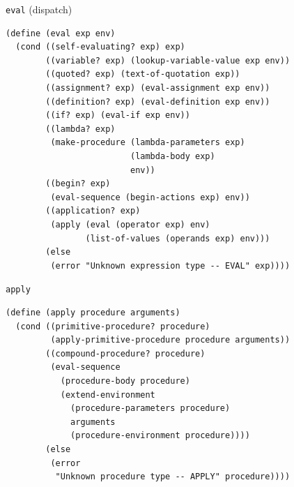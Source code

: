 \documentclass[presentation, bigger]{beamer}
\begin{document}
\begin{frame}[label={sec:org54f6ddb},fragile]{\texttt{eval} (dispatch)}
\begin{lstlisting}
(define (eval exp env)
  (cond ((self-evaluating? exp) exp)
        ((variable? exp) (lookup-variable-value exp env))
        ((quoted? exp) (text-of-quotation exp))
        ((assignment? exp) (eval-assignment exp env))
        ((definition? exp) (eval-definition exp env))
        ((if? exp) (eval-if exp env))
        ((lambda? exp)
         (make-procedure (lambda-parameters exp)
                         (lambda-body exp)
                         env))
        ((begin? exp)
         (eval-sequence (begin-actions exp) env))
        ((application? exp)
         (apply (eval (operator exp) env)
                (list-of-values (operands exp) env)))
        (else
         (error "Unknown expression type -- EVAL" exp))))
\end{lstlisting}
\end{frame}
\begin{frame}[label={sec:org1c939df},fragile]{\texttt{apply}}
\begin{lstlisting}
(define (apply procedure arguments)
  (cond ((primitive-procedure? procedure)
         (apply-primitive-procedure procedure arguments))
        ((compound-procedure? procedure)
         (eval-sequence
           (procedure-body procedure)
           (extend-environment
             (procedure-parameters procedure)
             arguments
             (procedure-environment procedure))))
        (else
         (error
          "Unknown procedure type -- APPLY" procedure))))
\end{lstlisting}
\end{frame}
\end{document}
